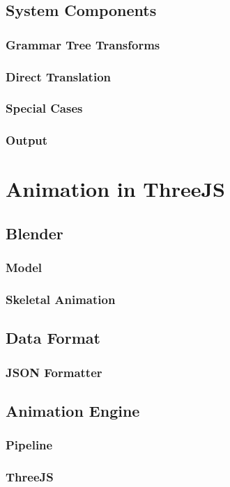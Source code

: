 \documentclass[12pt]{ociamthesis}  %
\begin{document}
	\subsection{System Components}
		\subsubsection{Grammar Tree Transforms}
		\subsubsection{Direct Translation}
		\subsubsection{Special Cases}
		\subsubsection{Output}
	
\section{Animation in ThreeJS}
	\subsection{Blender}
		\subsubsection{Model}
		\subsubsection{Skeletal Animation}
	\subsection{Data Format}
		\subsubsection{JSON Formatter}
	\subsection{Animation Engine}
		\subsubsection{Pipeline}
		\subsubsection{ThreeJS}
	
\end{document}
